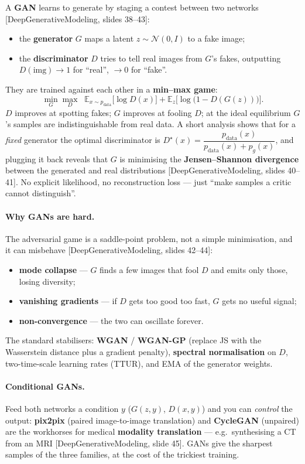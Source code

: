 \documentclass[11pt]{article}
\newcommand{\E}{\mathbb{E}}
\newcommand{\deck}[1]{\textsf{\small[#1]}}
\begin{document}
A \textbf{GAN} learns to generate by staging a contest between two networks
\deck{DeepGenerativeModeling, slides 38--43}:
\begin{itemize}[nosep,leftmargin=*]
  \item the \textbf{generator} $G$ maps a latent $z\sim\mathcal{N}(0,I)$ to a fake
  image;
  \item the \textbf{discriminator} $D$ tries to tell real images from $G$'s fakes,
  outputting $D(\text{img})\to1$ for ``real'', $\to0$ for ``fake''.
\end{itemize}
They are trained against each other in a \textbf{min--max game}:
\[
\min_G \max_D\;\; \E_{x\sim p_{\text{data}}}\!\big[\log D(x)\big]
   + \E_{z}\!\big[\log\big(1 - D(G(z))\big)\big].
\]
$D$ improves at spotting fakes; $G$ improves at fooling $D$; at the ideal
equilibrium $G$'s samples are indistinguishable from real data. A short analysis
shows that for a \emph{fixed} generator the optimal discriminator is
$D^\star(x)=\dfrac{p_{\text{data}}(x)}{p_{\text{data}}(x)+p_g(x)}$, and plugging it
back reveals that $G$ is minimising the \textbf{Jensen--Shannon divergence}
between the generated and real distributions \deck{DeepGenerativeModeling, slides
40--41}. No explicit likelihood, no reconstruction loss --- just ``make samples a
critic cannot distinguish''.

\paragraph{Why GANs are hard.} The adversarial game is a saddle-point problem,
not a simple minimisation, and it can misbehave \deck{DeepGenerativeModeling,
slides 42--44}:
\begin{itemize}[nosep,leftmargin=*]
  \item \textbf{mode collapse} --- $G$ finds a few images that fool $D$ and emits
  only those, losing diversity;
  \item \textbf{vanishing gradients} --- if $D$ gets too good too fast, $G$ gets no
  useful signal;
  \item \textbf{non-convergence} --- the two can oscillate forever.
\end{itemize}
The standard stabilisers: \textbf{WGAN} / \textbf{WGAN-GP} (replace JS with the
Wasserstein distance plus a gradient penalty), \textbf{spectral normalisation}
on $D$, two-time-scale learning rates (TTUR), and EMA of the generator weights.

\paragraph{Conditional GANs.} Feed both networks a condition $y$ ($G(z,y)$,
$D(x,y)$) and you can \emph{control} the output: \textbf{pix2pix} (paired
image-to-image translation) and \textbf{CycleGAN} (unpaired) are the workhorses
for medical \textbf{modality translation} --- e.g.\ synthesising a CT from an MRI
\deck{DeepGenerativeModeling, slide 45}. GANs give the sharpest samples of the
three families, at the cost of the trickiest training.
\end{document}
